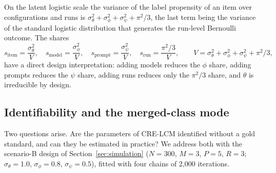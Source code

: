 On the latent logistic scale the variance of the label propensity of an item over
configurations and runs is $\sigma_\theta^2 + \sigma_\phi^2 + \sigma_\psi^2 + \pi^2/3$,
the last term being the variance of the standard logistic distribution that generates the
run-level Bernoulli outcome. The shares
\begin{equation}\label{eq:shares}
  s_{\mathrm{item}} = \frac{\sigma_\theta^2}{V}, \quad
  s_{\mathrm{model}} = \frac{\sigma_\phi^2}{V}, \quad
  s_{\mathrm{prompt}} = \frac{\sigma_\psi^2}{V}, \quad
  s_{\mathrm{run}} = \frac{\pi^2/3}{V}, \qquad
  V = \sigma_\theta^2 + \sigma_\phi^2 + \sigma_\psi^2 + \pi^2/3,
\end{equation}
have a direct design interpretation: adding models reduces the $\phi$ share, adding
prompts reduces the $\psi$ share, adding runs reduces only the $\pi^2/3$ share, and
$\theta$ is irreducible by design.

\subsection{Identifiability and the merged-class mode}\label{sec:ident}

Two questions arise. Are the parameters of CRE-LCM identified without a gold standard, and can they be estimated in practice? We address both with the scenario-B design of Section~\ref{sec:simulation} ($N = 300$, $M = 3$, $P = 5$, $R = 3$; $\sigma_\theta = 1.0$, $\sigma_\phi = 0.8$, $\sigma_\psi = 0.5$), fitted with four chains of 2,000 iterations.

